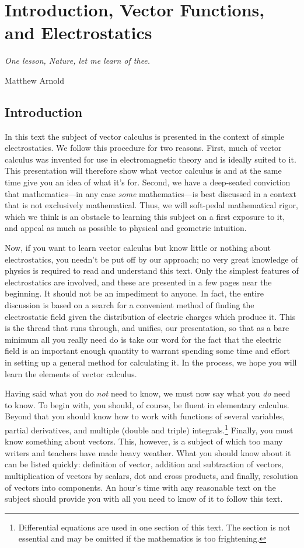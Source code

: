 \chapter{Introduction, Vector Functions, and Electrostatics}
\epigraph{\itshape One lesson, Nature, let me learn of thee.}{Matthew Arnold}

\section{Introduction}

In this text the subject of vector calculus is presented in the context of simple electrostatics. We follow this procedure for two reasons. First, much of vector calculus was invented for use in electromagnetic theory and is ideally suited to it. This presentation will therefore show what vector calculus is and at the same time give you an idea of what it's for. Second, we have a deep-seated conviction that mathematics---in any case \emph{some} mathematics---is best discussed in a context that is not exclusively mathematical. Thus, we will soft-pedal mathematical rigor, which we think is an obstacle to learning this subject on a first exposure to it, and appeal as much as possible to physical and geometric intuition.

Now, if you want to learn vector calculus but know little or nothing about electrostatics, you needn't be put off by our approach; no very great knowledge of physics is required to read and understand this text. Only the simplest features of electrostatics are involved, and these are presented in a few pages near the beginning. It should not be an impediment to anyone. In fact, the entire discussion is based on a search for a convenient method of finding the electrostatic field given the distribution of electric charges which produce it. This is the thread that runs through, and unifies, our presentation, so that as a bare minimum all you really need do is take our word for the fact that the electric field is an important enough quantity to warrant spending some time and effort in setting up a general method for calculating it. In the process, we hope you will learn the elements of vector calculus.

Having said what you do \emph{not} need to know, we must now say what you \emph{do} need to know. To begin with, you should, of course, be fluent in elementary calculus. Beyond that you should know how to work with functions of several variables, partial derivatives, and multiple (double and triple) integrals.\footnote{Differential equations are used in one section of this text. The section is not essential and may be omitted if the mathematics is too frightening.} Finally, you must know something about vectors. This, however, is a subject of which too many writers and teachers have made heavy weather. What you should know about it can be listed quickly: definition of vector, addition and subtraction of vectors, multiplication of vectors by scalars, dot and cross products, and finally, resolution of vectors into components. An hour's time with any reasonable text on the subject should provide you with all you need to know of it to follow this text.

